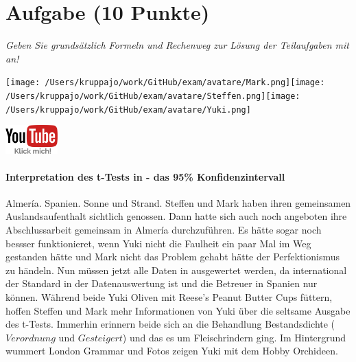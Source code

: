\documentclass[a4paper, 9pt]{scrartcl}\usepackage[]{graphicx}\usepackage[]{xcolor}
\begin{document}
\section{Aufgabe \hfill (10 Punkte)}

\textit{Geben Sie grundsätzlich Formeln und Rechenweg zur Lösung der Teilaufgaben mit an!} \\[1Ex]
 

 
\begin{minipage}[t]{0.5\textwidth}
\texttt{[image: /Users/kruppajo/work/GitHub/exam/avatare/Mark.png]}\hspace{-4mm}\texttt{[image: /Users/kruppajo/work/GitHub/exam/avatare/Steffen.png]}\hspace{-4mm}\texttt{[image: /Users/kruppajo/work/GitHub/exam/avatare/Yuki.png]}
\end{minipage}
\begin{minipage}[t]{0.5\textwidth}
\hfill
\href{https://youtu.be/wJqsNV1hOW8}{\includegraphics[width = 2cm]{img/youtube}}
\end{minipage}



\paragraph{Interpretation des t-Tests in \Rlogo - das 95\% Konfidenzintervall}


Almería. Spanien. Sonne und Strand. Steffen und Mark haben ihren gemeinsamen Auslandsaufenthalt sichtlich genossen. Dann hatte sich auch noch angeboten ihre Abschlussarbeit gemeinsam in Almería durchzuführen. Es hätte sogar noch bessser funktionieret, wenn Yuki nicht die Faulheit ein paar Mal im Weg gestanden hätte und Mark nicht das Problem gehabt hätte der Perfektionismus zu händeln. Nun müssen jetzt alle Daten in \Rlogo ausgewertet werden, da \Rlogo international der Standard in der Datenauswertung ist und die Betreuer in Spanien nur \Rlogo können. Während beide Yuki Oliven mit Reese's Peanut Butter Cups füttern, hoffen Steffen und Mark mehr Informationen von Yuki über die seltsame \Rlogo Ausgabe des t-Tests. Immerhin erinnern beide sich an die Behandlung Bestandsdichte ($Verordnung$ und $Gesteigert$) und das es um Fleischrindern ging. Im Hintergrund wummert London Grammar und Fotos zeigen Yuki mit dem Hobby Orchideen.
\end{document}
